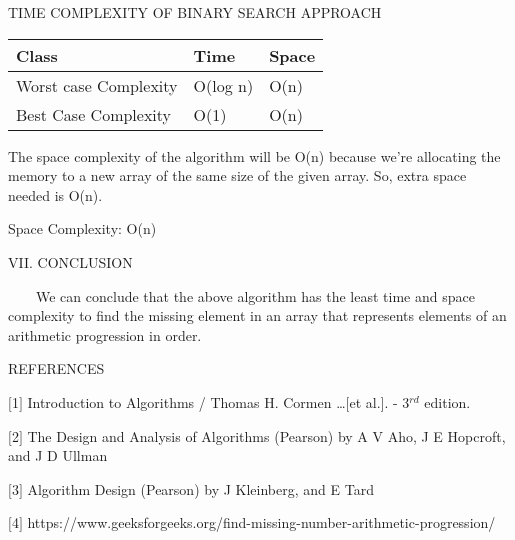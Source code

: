 \documentclass[12pt,a4paper]{article}
\begin{document}
\begin{center}TIME COMPLEXITY OF BINARY SEARCH APPROACH\end{center}

\begin{table}[h]
\centering
\begin{tabular}{|l|l|l|}
\hline
\textbf{Class} & \textbf{Time} & \textbf{Space} \\
\hline
Worst case Complexity & O(log n) & O(n) \\
\hline
Best Case Complexity & O(1) & O(n) \\
\hline
\end{tabular}
\end{table}

\begin{multicols}{2}
The space complexity of the algorithm will be O(n) because we're allocating the memory to a new array of the same size of the given array. So, extra space needed is O(n).

Space Complexity: O(n)


\begin{center}VII. CONCLUSION\end{center}

\ \ \ \ We can conclude that the above algorithm has the least time and space 
complexity to find the missing element in an array that represents elements of an arithmetic progression in order.


\begin{center}REFERENCES\end{center}

$[$1$]$ Introduction to Algorithms / Thomas H. Cormen \ldots $[$et 
al.$]$. - 3$^{rd}$ edition.

$[$2$]$ The Design and Analysis of Algorithms (Pearson) by A V Aho, J E 
Hopcroft, and J D Ullman 

$[$3$]$ Algorithm Design (Pearson) by J Kleinberg, and E Tard

$[$4$]$ https://www.geeksforgeeks.org/find-missing-number-arithmetic-progression/

\end{multicols}
\end{document}
